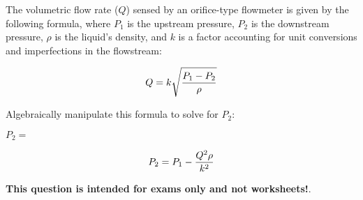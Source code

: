 

The volumetric flow rate ($Q$) sensed by an orifice-type flowmeter is given by the following formula, where $P_1$ is the upstream pressure, $P_2$ is the downstream pressure, $\rho$ is the liquid's density, and $k$ is a factor accounting for unit conversions and imperfections in the flowstream:
 
$$Q = k \sqrt{{P_1 - P_2} \over \rho}$$

Algebraically manipulate this formula to solve for $P_2$:

\vskip 20pt

$P_2 = $







$$P_2 = P_1 - {Q^2 \rho \over k^2}$$







{\bf This question is intended for exams only and not worksheets!}.



